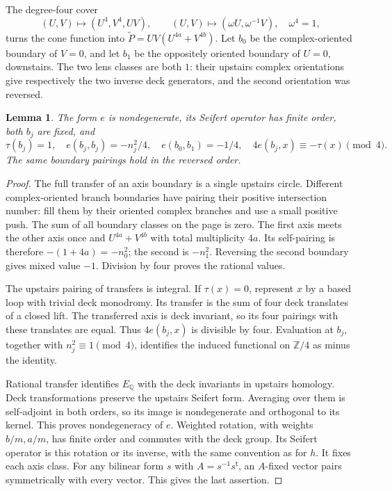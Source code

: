 \documentclass[11pt]{article}
\newtheorem{lemma}[theorem]{Lemma}
\newcommand{\Q}{\mathbb Q}
\newcommand{\Z}{\mathbb Z}
\begin{document}
The degree-four cover
\[
 (U,V)\longmapsto(U^4,V^4,UV),\qquad
 (U,V)\longmapsto(\omega U,\omega^{-1}V),\quad \omega^4=1,
\]
turns the cone function into
\(\widetilde P=UV(U^{4a}+V^{4b})\).
Let \(b_0\) be the complex-oriented boundary of \(V=0\), and let
\(b_1\) be the oppositely oriented boundary of \(U=0\), downstairs.
The two lens classes are both \(1\): their upstairs complex
orientations give respectively the two inverse deck generators,
and the second orientation was reversed.

\begin{lemma}\label{lem:boundary}
The form \(e\) is nondegenerate, its Seifert operator has finite
order, both \(b_j\) are fixed, and
\[
 \tau(b_j)=1,\quad e(b_j,b_j)=-n_j^2/4,\quad
 e(b_0,b_1)=-1/4,\quad
 4e(b_j,x)\equiv-\tau(x)\pmod4.                 \tag{7}
\]
The same boundary pairings hold in the reversed order.
\end{lemma}

\begin{proof}
The full transfer of an axis boundary is a single upstairs circle.
Different complex-oriented branch boundaries have pairing their
positive intersection number: fill them by their oriented complex
branches and use a small positive push. The sum of all boundary
classes on the page is zero. The first axis meets the other axis
once and \(U^{4a}+V^{4b}\) with total multiplicity \(4a\).
Its self-pairing is therefore \(-(1+4a)=-n_0^2\);
the second is \(-n_1^2\). Reversing the second boundary gives
mixed value \(-1\). Division by four proves the rational values.

The upstairs pairing of transfers is integral. If \(\tau(x)=0\),
represent \(x\) by a based loop with trivial deck monodromy.
Its transfer is the sum of four deck translates of a closed lift.
The transferred axis is deck invariant, so its four pairings with
these translates are equal. Thus \(4e(b_j,x)\) is divisible by four.
Evaluation at \(b_j\), together with \(n_j^2\equiv1\pmod4\),
identifies the induced functional on \(\Z/4\) as minus the identity.

Rational transfer identifies \(E_\Q\) with the deck invariants in
upstairs homology. Deck transformations preserve the upstairs
Seifert form. Averaging over them is self-adjoint in both orders,
so its image is nondegenerate and orthogonal to its kernel.
This proves nondegeneracy of \(e\).
Weighted rotation, with weights \(b/m,a/m\), has finite order
and commutes with the deck group. Its Seifert operator is this
rotation or its inverse, with the same convention as for \(h\).
It fixes each axis class. For any bilinear form \(s\) with
\(A=s^{-1}s^{\mathsf t}\), an \(A\)-fixed vector pairs
symmetrically with every vector. This gives the last assertion.
\end{proof}
\end{document}
